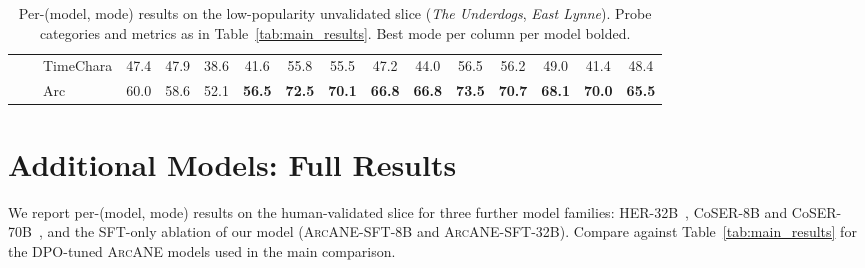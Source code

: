 \documentclass[11pt]{article}
\newcommand{\ours}{\textsc{ArcANE}}
\begin{document}
\begin{table}[t]
\begin{tabular}{lllccccccccccccc}
 &  & TimeChara & 47.4 & 47.9 & 38.6 & 41.6 & 55.8 & 55.5 & 47.2 & 44.0 & 56.5 & 56.2 & 49.0 & 41.4 & 48.4 \\
 &  & \cellcolor{yellow!15} Arc & \cellcolor{yellow!15} 60.0 & \cellcolor{yellow!15} 58.6 & \cellcolor{yellow!15} 52.1 & \cellcolor{yellow!15} \textbf{56.5} & \cellcolor{yellow!15} \textbf{72.5} & \cellcolor{yellow!15} \textbf{70.1} & \cellcolor{yellow!15} \textbf{66.8} & \cellcolor{yellow!15} \textbf{66.8} & \cellcolor{yellow!15} \textbf{73.5} & \cellcolor{yellow!15} \textbf{70.7} & \cellcolor{yellow!15} \textbf{68.1} & \cellcolor{yellow!15} \textbf{70.0} & \cellcolor{yellow!15} \textbf{65.5} \\
\bottomrule
\end{tabular}
\caption{Per-(model, mode) results on the low-popularity unvalidated slice (\emph{The Underdogs}, \emph{East Lynne}). Probe categories and metrics as in Table~\ref{tab:main_results}. Best mode per column per model bolded.}
\label{tab:main_results_extra3}
\end{table}

\section{Additional Models: Full Results\label{app:added-results}}

We report per-(model, mode) results on the human-validated slice for three further model families: HER-32B~\cite{du2026herhumanlikereasoningreinforcement}, CoSER-8B and CoSER-70B~\cite{wang2025coser}, and the SFT-only ablation of our model (\ours{}-SFT-8B and \ours{}-SFT-32B). Compare against Table~\ref{tab:main_results} for the DPO-tuned \ours{} models used in the main comparison.
\end{document}
